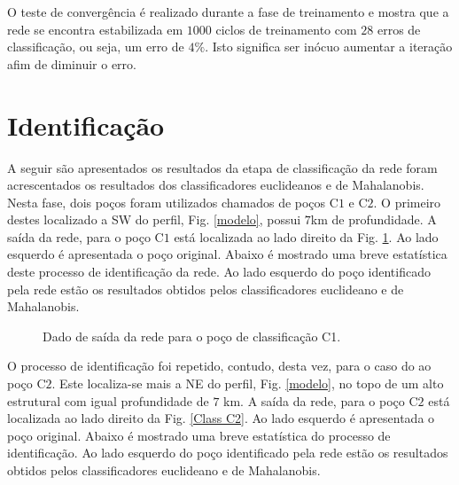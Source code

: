 O teste de convergência é realizado durante a fase de treinamento e mostra que a rede se encontra estabilizada em  $1000$ ciclos de treinamento com $28$ erros de classificação, ou seja, um erro de $4\%$. Isto significa ser inócuo aumentar a iteração afim de diminuir o erro. 



\section{Identificação}

A seguir são apresentados os resultados da etapa de classificação da rede foram acrescentados os resultados dos classificadores euclideanos e de Mahalanobis. Nesta fase, dois poços foram utilizados chamados de poços C$1$ e C$2$. O primeiro destes localizado a SW do perfil, Fig. \ref{modelo}, possui $7$km de profundidade. A saída da rede, para o poço C$1$ está localizada ao lado direito da Fig. \ref{Class C1}. Ao lado esquerdo é apresentada o poço original. Abaixo é mostrado uma breve estatística deste processo de identificação da rede. Ao lado esquerdo do poço identificado pela rede estão os resultados obtidos pelos classificadores euclideano e de Mahalanobis. 


\begin{figure}[H]
	\centering
	\setlength{\fboxsep}{8pt}
	\setlength{\fboxrule}{0.1pt}
	\caption{Dado de saída da rede para o poço de classificação C1.}
	\label{Class C1}
\end{figure} 


O processo de identificação foi repetido, contudo, desta vez, para o caso do ao poço C$2$. Este localiza-se mais a NE do perfil, Fig. \ref{modelo}, no topo de um alto estrutural com igual profundidade de $7$ km. A saída da rede, para o poço C$2$ está localizada ao lado direito da Fig. \ref{Class C2}. Ao lado esquerdo é apresentada o poço original. Abaixo é mostrado uma breve estatística do processo de identificação.  Ao lado esquerdo do poço identificado pela rede estão os resultados obtidos pelos classificadores euclideano e de Mahalanobis.  


